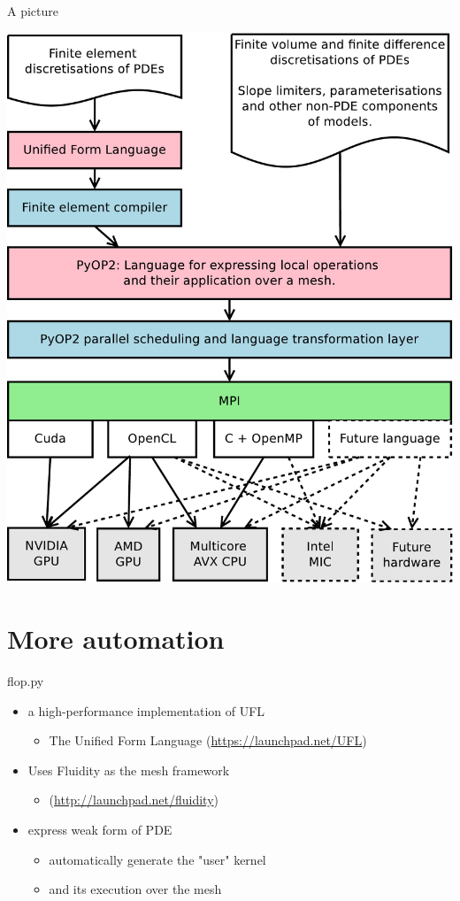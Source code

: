 \documentclass[bigger]{beamer}
\begin{document}
\begin{frame}[label={sec:orgheadline15}]{A picture}
\begin{center}
\includegraphics[height=.9\textheight]{01-22-HIPEAC-PyOP2.figures/abstractions.pdf}
\end{center}
\end{frame}

\section{More automation}
\label{sec:orgheadline21}
\begin{frame}[label={sec:orgheadline17}]{flop.py}
\begin{itemize}
\item a high-performance implementation of UFL
\begin{itemize}
\item The Unified Form Language (\url{https://launchpad.net/UFL})
\end{itemize}
\item Uses Fluidity as the mesh framework
\begin{itemize}
\item (\url{http://launchpad.net/fluidity})
\end{itemize}
\item express weak form of PDE
\begin{itemize}
\item automatically generate the "user" kernel
\item and its execution over the mesh
\end{itemize}
\end{itemize}
\end{frame}
\end{document}
